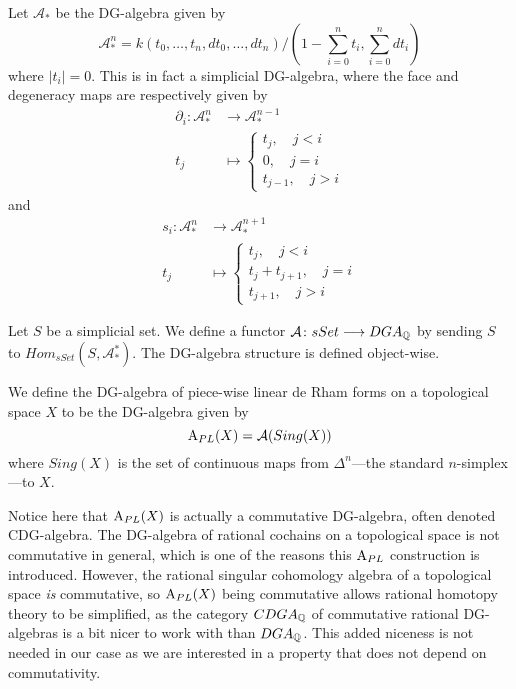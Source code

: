 \begin{definition}
Let $\mathcal{A}_*$ be the DG-algebra given by 
\begin{equation*}
    \mathcal{A}^n_* = k(t_0, \ldots, t_n, dt_0, \ldots, dt_n)/(1-\sum_{i=0}^n t_i, \sum_{i=0}^n dt_i) 
\end{equation*}
where $|t_i|=0$. This is in fact a simplicial DG-algebra, where the face and degeneracy maps are respectively given by 
\begin{align*}
    \partial_i\colon \mathcal{A}_*^n &\longrightarrow\mathcal{A}_*^{n-1} \\
    t_j&\longmapsto
    \begin{cases}
        t_j, \quad j<i \\
        0, \quad j=i \\
        t_{j-1}, \quad j>i
    \end{cases}
\end{align*}
and 
\begin{align*}
    s_i\colon \mathcal{A}_*^n &\longrightarrow\mathcal{A}_*^{n+1} \\
    t_j&\longmapsto
    \begin{cases}
        t_j, \quad j<i \\
        t_j+t_{j+1}, \quad j=i \\
        t_{j+1}, \quad j>i
    \end{cases}
\end{align*}
\end{definition}

\begin{definition}
Let $S$ be a simplicial set. We define a functor $\mathcal{A}\colon sSet\longrightarrow DGA_{\mathbb{Q}}$ by sending $S$ to $Hom_{sSet}(S, \mathcal{A}_*^*)$. The DG-algebra structure is defined object-wise.
\end{definition}


\begin{example}
\label{ex:piece-wise_algebra}
We define the DG-algebra of piece-wise linear de Rham forms on a topological space $X$ to be the DG-algebra given by
\begin{equation*}
    \text{A}_{PL}(X) = \mathcal{A}(Sing(X))
\end{equation*}
where $Sing(X)$ is the set of continuous maps from $\Delta^n$---the standard $n$-simplex---to $X$. 
\end{example}

Notice here that $\text{A}_{PL}(X)$ is actually a commutative DG-algebra, often denoted CDG-algebra. The DG-algebra of rational cochains on a topological space is not commutative in general, which is one of the reasons this $\text{A}_{PL}$ construction is introduced. However, the rational singular cohomology algebra of a topological space \emph{is} commutative, so $\text{A}_{PL}(X)$ being commutative allows rational homotopy theory to be simplified, as the category $CDGA_{\mathbb{Q}}$ of commutative rational DG-algebras is a bit nicer to work with than $DGA_{\mathbb{Q}}$. This added niceness is not needed in our case as we are interested in a property that does not depend on commutativity.  




